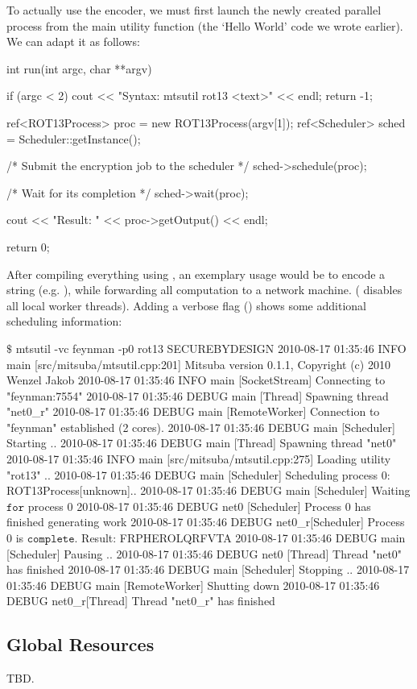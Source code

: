 To actually use the  encoder, we must first launch the newly created parallel process
from the main utility function (the `Hello World' code we wrote earlier). We can adapt it as follows:
\begin{cpp}
	int run(int argc, char **argv) {
		if (argc < 2) {
			cout << "Syntax: mtsutil rot13 <text>" << endl;
			return -1;
		}

		ref<ROT13Process> proc = new ROT13Process(argv[1]);
		ref<Scheduler> sched = Scheduler::getInstance();

		/* Submit the encryption job to the scheduler */
		sched->schedule(proc);

		/* Wait for its completion */
		sched->wait(proc);

		cout << "Result: " << proc->getOutput() << endl;

		return 0;
	}
\end{cpp}
After compiling everything using , an exemplary usage
would be to encode a string (e.g. ), while 
forwarding all computation to a network machine. ( disables
all local worker threads). Adding a verbose flag () shows 
some additional scheduling information:
\begin{shell}
$\texttt{\$}$ mtsutil -vc feynman -p0 rot13 SECUREBYDESIGN
2010-08-17 01:35:46 INFO  main [src/mitsuba/mtsutil.cpp:201] Mitsuba version 0.1.1, Copyright (c) 2010 Wenzel Jakob
2010-08-17 01:35:46 INFO  main [SocketStream] Connecting to "feynman:7554"
2010-08-17 01:35:46 DEBUG main [Thread] Spawning thread "net0_r"
2010-08-17 01:35:46 DEBUG main [RemoteWorker] Connection to "feynman" established (2 cores).
2010-08-17 01:35:46 DEBUG main [Scheduler] Starting ..
2010-08-17 01:35:46 DEBUG main [Thread] Spawning thread "net0"
2010-08-17 01:35:46 INFO  main [src/mitsuba/mtsutil.cpp:275] Loading utility "rot13" ..
2010-08-17 01:35:46 DEBUG main [Scheduler] Scheduling process 0: ROT13Process[unknown]..
2010-08-17 01:35:46 DEBUG main [Scheduler] Waiting $\texttt{for}$ process 0
2010-08-17 01:35:46 DEBUG net0 [Scheduler] Process 0 has finished generating work
2010-08-17 01:35:46 DEBUG net0_r[Scheduler] Process 0 is $\texttt{complete}$.
Result: FRPHEROLQRFVTA
2010-08-17 01:35:46 DEBUG main [Scheduler] Pausing ..
2010-08-17 01:35:46 DEBUG net0 [Thread] Thread "net0" has finished
2010-08-17 01:35:46 DEBUG main [Scheduler] Stopping ..
2010-08-17 01:35:46 DEBUG main [RemoteWorker] Shutting down
2010-08-17 01:35:46 DEBUG net0_r[Thread] Thread "net0_r" has finished
\end{shell}
\subsection{Global Resources}
TBD.
